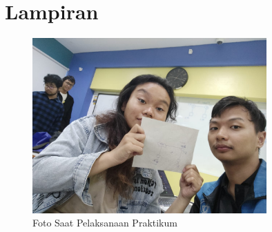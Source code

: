 \section*{Lampiran} %

\begin{figure}[H]
    \centering
    \includegraphics[width=0.8\textwidth]{img/foto_keren.jpeg}
    \caption{Foto Saat Pelaksanaan Praktikum}
    \label{fig:foto_keren}
\end{figure}